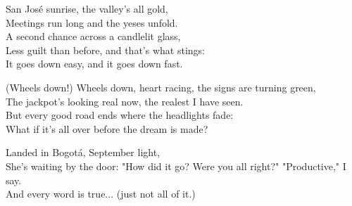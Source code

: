 \begin{lyrics}
San José sunrise, the valley's all gold,\\
Meetings run long and the yeses unfold.\\
A second chance across a candlelit glass,\\
Less guilt than before, and that's what stings:\\
It goes down easy, and it goes down fast.

(Wheels down!) Wheels down, heart racing, the signs are turning green,\\
The jackpot's looking real now, the realest I have seen.\\
But every good road ends where the headlights fade:\\
What if it's all over before the dream is made?

Landed in Bogotá, September light,\\
She's waiting by the door: "How did it go? Were you all right?"
 "Productive," I say.\\
And every word is true...
(just not all of it.)
\end{lyrics}

